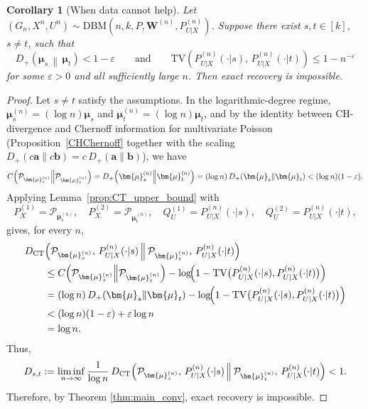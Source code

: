 \documentclass[11pt]{article}
\theoremstyle{plain}
\newtheorem{corollary}[theorem]{Corollary}
\theoremstyle{definition}
\begin{document}
\begin{corollary}[When data cannot help]\label{thm:TV_D+}
Let $(G_n,X^n,U^n)\sim \mathrm{DBM}\!\left(n,k,P,\mathbf{W}^{(n)},P^{(n)}_{U|X}\right)$.
Suppose there exist $s,t\in[k]$, $s\neq t$, such that
\[
D_+\!\left(\boldsymbol{\mu}_s \,\middle\|\, \boldsymbol{\mu}_t\right)<1-\varepsilon
\qquad\text{and}\qquad
\mathrm{TV}\!\left(P^{(n)}_{U|X}(\cdot|s),\,P^{(n)}_{U|X}(\cdot|t)\right)
\le 1-n^{-\varepsilon}
\]
for some $\varepsilon>0$ and all sufficiently large $n$.
Then exact recovery is impossible.
\end{corollary}
\begin{proof}
Let $s\neq t$ satisfy the assumptions. In the logarithmic-degree regime, $\bm{\mu}_s^{(n)}=(\log n)\bm{\mu}_s$
and $\bm{\mu}_t^{(n)}=(\log n)\bm{\mu}_t$, and by the identity
between CH-divergence and Chernoff information for multivariate Poisson
(Proposition~\ref{CHChernoff} together with the scaling
$D_+(c\bm{a}\|c\bm{b})=c\,D_+(\bm{a}\|\bm{b})$), we have
\[
C\Bigl(\mathcal{P}_{\bm{\mu}_s^{(n)}}\Big\|\mathcal{P}_{\bm{\mu}_t^{(n)}}\Bigr)
=
D_+\!\left(\bm{\mu}_s^{(n)}\middle\|\bm{\mu}_t^{(n)}\right)
=
(\log n)\,D_+\!\left(\bm{\mu}_s\middle\|\bm{\mu}_t\right)< (\log n)(1-\varepsilon).
\]
Applying Lemma~\ref{prop:CT_upper_bound} with
\[
P_X^{(1)}=\mathcal{P}_{\bm{\mu}_s^{(n)}},\quad
P_X^{(2)}=\mathcal{P}_{\bm{\mu}_t^{(n)}},\quad
Q_U^{(1)}=P^{(n)}_{U|X}(\cdot|s),\quad
Q_U^{(2)}=P^{(n)}_{U|X}(\cdot|t),
\]
gives, for every $n$,
\begin{align*}
&D_{\mathrm{CT}}\Bigl(\mathcal{P}_{\bm{\mu}_s^{(n)}},\,P^{(n)}_{U|X}(\cdot|s)\,\Big\|\,\mathcal{P}_{\bm{\mu}_t^{(n)}},\,P^{(n)}_{U|X}(\cdot|t)\Bigr) \\
&\qquad\le
C\Bigl(\mathcal{P}_{\bm{\mu}_s^{(n)}}\Big\|\mathcal{P}_{\bm{\mu}_t^{(n)}}\Bigr)
-\log\!\Bigl(1-\mathrm{TV}\bigl(P^{(n)}_{U|X}(\cdot|s),P^{(n)}_{U|X}(\cdot|t)\bigr)\Bigr)\\
&\qquad=(\log n)\,D_+\!\left(\bm{\mu}_s\middle\|\bm{\mu}_t\right)-\log\!\Bigl(1-\mathrm{TV}\bigl(P^{(n)}_{U|X}(\cdot|s),P^{(n)}_{U|X}(\cdot|t)\bigr)\Bigr)\\
&\qquad< (\log n)(1-\varepsilon)+\varepsilon\log n\\
&\qquad = \log n.
\end{align*}
Thus, 
\[
D_{s,t}
:=\liminf_{n\to\infty}\frac{1}{\log n}\,
D_{\mathrm{CT}}\Bigl(\mathcal{P}_{\bm{\mu}_s^{(n)}},\,P^{(n)}_{U|X}(\cdot|s)\,\Big\|\,\mathcal{P}_{\bm{\mu}_t^{(n)}},\,P^{(n)}_{U|X}(\cdot|t)\Bigr)<1.
\]
Therefore, by Theorem \ref{thm:main_conv}, exact recovery is impossible.
\end{proof}
\end{document}
